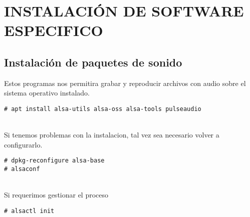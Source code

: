 \chapter{\uppercase{Instalación de software especifico}}\label{chap:ins.sof.esp}

\newpage

\section{Instalación de paquetes de sonido}
Estos programas nos permitira grabar y reproducir archivos con audio sobre el sistema operativo instalado.
\begin{verbatim}
# apt install alsa-utils alsa-oss alsa-tools pulseaudio
\end{verbatim}
\\[1em]
Si tenemos problemas con la instalacion, tal vez sea necesario volver a configurarlo.
\begin{verbatim}
# dpkg-reconfigure alsa-base
# alsaconf
\end{verbatim}
\\[1em]
Si requerimos gestionar el proceso
\begin{verbatim}
# alsactl init
\end{verbatim}
\\[1em]

